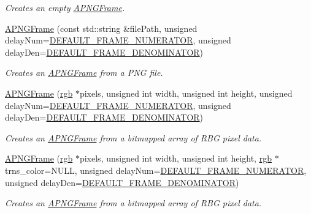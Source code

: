 \begin{DoxyCompactItemize}
\begin{DoxyCompactList}\small\item\em Creates an empty \hyperlink{classapngasm_1_1APNGFrame}{A\-P\-N\-G\-Frame}. \end{DoxyCompactList}\item 
\hyperlink{classapngasm_1_1APNGFrame_a258b93f5179fab0e04af0ed0697f2893}{A\-P\-N\-G\-Frame} (const std\-::string \&file\-Path, unsigned delay\-Num=\hyperlink{namespaceapngasm_a5b334b6957e14291ff8f76cab562f60f}{D\-E\-F\-A\-U\-L\-T\-\_\-\-F\-R\-A\-M\-E\-\_\-\-N\-U\-M\-E\-R\-A\-T\-O\-R}, unsigned delay\-Den=\hyperlink{namespaceapngasm_a867b3acbcc2624faf6b3e82732110594}{D\-E\-F\-A\-U\-L\-T\-\_\-\-F\-R\-A\-M\-E\-\_\-\-D\-E\-N\-O\-M\-I\-N\-A\-T\-O\-R})
\begin{DoxyCompactList}\small\item\em Creates an \hyperlink{classapngasm_1_1APNGFrame}{A\-P\-N\-G\-Frame} from a P\-N\-G file. \end{DoxyCompactList}\item 
\hyperlink{classapngasm_1_1APNGFrame_afd794300a428dc7c60686cfc92d9356a}{A\-P\-N\-G\-Frame} (\hyperlink{structapngasm_1_1rgb}{rgb} $\ast$pixels, unsigned int width, unsigned int height, unsigned delay\-Num=\hyperlink{namespaceapngasm_a5b334b6957e14291ff8f76cab562f60f}{D\-E\-F\-A\-U\-L\-T\-\_\-\-F\-R\-A\-M\-E\-\_\-\-N\-U\-M\-E\-R\-A\-T\-O\-R}, unsigned delay\-Den=\hyperlink{namespaceapngasm_a867b3acbcc2624faf6b3e82732110594}{D\-E\-F\-A\-U\-L\-T\-\_\-\-F\-R\-A\-M\-E\-\_\-\-D\-E\-N\-O\-M\-I\-N\-A\-T\-O\-R})
\begin{DoxyCompactList}\small\item\em Creates an \hyperlink{classapngasm_1_1APNGFrame}{A\-P\-N\-G\-Frame} from a bitmapped array of R\-B\-G pixel data. \end{DoxyCompactList}\item 
\hyperlink{classapngasm_1_1APNGFrame_a5d273fea8e908606a01f252a5ea19cdb}{A\-P\-N\-G\-Frame} (\hyperlink{structapngasm_1_1rgb}{rgb} $\ast$pixels, unsigned int width, unsigned int height, \hyperlink{structapngasm_1_1rgb}{rgb} $\ast$trns\-\_\-color=N\-U\-L\-L, unsigned delay\-Num=\hyperlink{namespaceapngasm_a5b334b6957e14291ff8f76cab562f60f}{D\-E\-F\-A\-U\-L\-T\-\_\-\-F\-R\-A\-M\-E\-\_\-\-N\-U\-M\-E\-R\-A\-T\-O\-R}, unsigned delay\-Den=\hyperlink{namespaceapngasm_a867b3acbcc2624faf6b3e82732110594}{D\-E\-F\-A\-U\-L\-T\-\_\-\-F\-R\-A\-M\-E\-\_\-\-D\-E\-N\-O\-M\-I\-N\-A\-T\-O\-R})
\begin{DoxyCompactList}\small\item\em Creates an \hyperlink{classapngasm_1_1APNGFrame}{A\-P\-N\-G\-Frame} from a bitmapped array of R\-B\-G pixel data. \end{DoxyCompactList}\item 

\end{DoxyCompactItemize}
